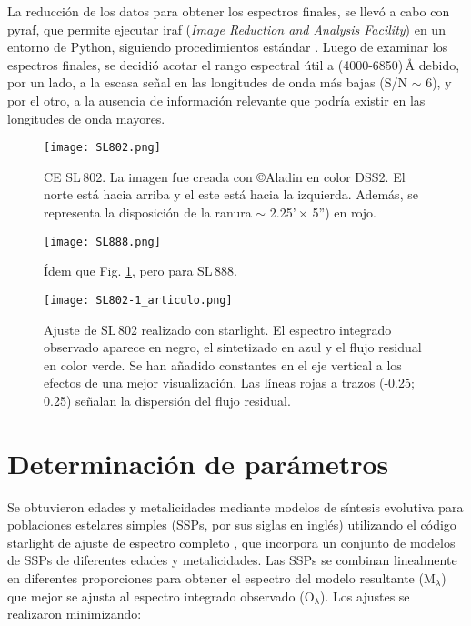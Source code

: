 \documentclass[baaa]{baaa}
\begin{document}
La reducción de los datos para obtener los espectros finales, se llevó a cabo con {\sc pyraf}, que permite ejecutar {\sc iraf} (\textit{Image Reduction and Analysis Facility}) en un entorno de Python, siguiendo procedimientos estándar \citep{Marti2023}. Luego de examinar los espectros finales, se decidió acotar el rango espectral útil a (4000-6850)\,\r{A} debido, por un lado, a la escasa señal en las longitudes de onda más bajas (S/N $\sim$ 6), y por el otro, a la ausencia de información relevante que podría existir en las longitudes de onda mayores.


\begin{figure}[!t]
\centering
\texttt{[image: SL802.png]}
\caption{CE SL\,802. La imagen fue creada con ©Aladin en color DSS2. El norte está hacia arriba y el este está hacia la izquierda. Además, se representa la disposición de la ranura $\sim$ 2.25'\,$\times$ 5'') en rojo.}
\label{F1}
\end{figure}


\begin{figure}[!t]
\centering
\texttt{[image: SL888.png]}
\caption{Ídem que Fig. \ref{F1}, pero para SL\,888.}
\label{F2}
\end{figure}


\begin{figure*}[!ht]
\centering
\texttt{[image: SL802-1\_articulo.png]}
\caption{Ajuste de SL\,802 realizado con {\sc starlight}. El espectro integrado observado aparece en negro, el sintetizado en azul y el flujo residual en color verde. Se han añadido constantes en el eje vertical a los efectos de una mejor visualización. Las líneas rojas a trazos (-0.25;\,0.25) señalan la dispersión del flujo residual.}
\label{F3}
\end{figure*}


\section{Determinación de parámetros}

Se obtuvieron edades y metalicidades mediante modelos de síntesis evolutiva para poblaciones estelares simples (SSPs, por sus siglas en inglés) utilizando el código {\sc starlight} de ajuste de espectro completo \citep{CF2005}, que incorpora un conjunto de modelos de SSPs de diferentes edades y metalicidades. Las SSPs se combinan linealmente en diferentes proporciones para obtener el espectro del modelo resultante (M$_{\lambda}$) que mejor se ajusta al espectro integrado observado (O$_{\lambda}$). Los ajustes se realizaron minimizando:
\end{document}
